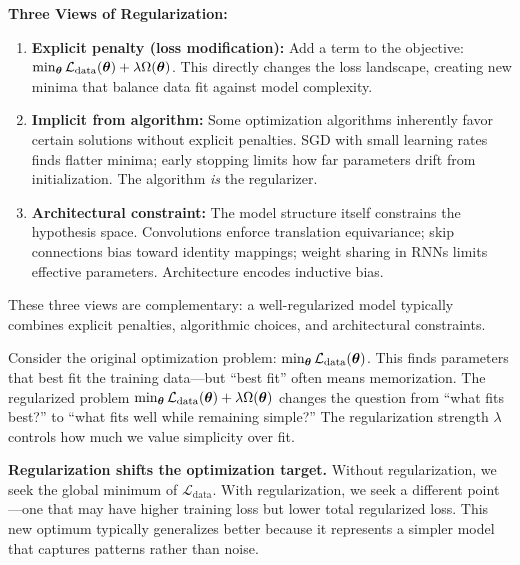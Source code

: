 \documentclass[../../main.tex]{subfiles}
\begin{document}
\begin{keyconcept}
\textbf{Three Views of Regularization:}
\begin{enumerate}
    \item \textbf{Explicit penalty (loss modification):} Add a term to the objective: $\min_{\boldsymbol{\theta}} \mathcal{L}_{\text{data}}(\boldsymbol{\theta}) + \lambda\Omega(\boldsymbol{\theta})$. This directly changes the loss landscape, creating new minima that balance data fit against model complexity.

    \item \textbf{Implicit from algorithm:} Some optimization algorithms inherently favor certain solutions without explicit penalties. SGD with small learning rates finds flatter minima; early stopping limits how far parameters drift from initialization. The algorithm \textit{is} the regularizer.

    \item \textbf{Architectural constraint:} The model structure itself constrains the hypothesis space. Convolutions enforce translation equivariance; skip connections bias toward identity mappings; weight sharing in RNNs limits effective parameters. Architecture encodes inductive bias.
\end{enumerate}
These three views are complementary: a well-regularized model typically combines explicit penalties, algorithmic choices, and architectural constraints.
\end{keyconcept}

\begin{intuition}
Consider the original optimization problem: $\min_{\boldsymbol{\theta}} \mathcal{L}_{\text{data}}(\boldsymbol{\theta})$. This finds parameters that best fit the training data---but ``best fit'' often means memorization. The regularized problem $\min_{\boldsymbol{\theta}} \mathcal{L}_{\text{data}}(\boldsymbol{\theta}) + \lambda\Omega(\boldsymbol{\theta})$ changes the question from ``what fits best?'' to ``what fits well while remaining simple?'' The regularization strength $\lambda$ controls how much we value simplicity over fit.
\end{intuition}

\begin{principle}
\textbf{Regularization shifts the optimization target.} Without regularization, we seek the global minimum of $\mathcal{L}_{\text{data}}$. With regularization, we seek a different point---one that may have higher training loss but lower total regularized loss. This new optimum typically generalizes better because it represents a simpler model that captures patterns rather than noise.
\end{principle}
\end{document}
